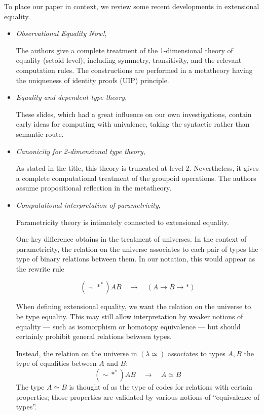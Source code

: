 \documentclass[10pt]{article}
\newcommand{\leeq}{\lambda {\eeq}}
\newcommand{\lRa}{\longrightarrow}
\newcommand{\sta}{*}
\newcommand{\rrule}{\hspace{1em}\lRa\hspace{1em}}
\newcommand{\eeq}{\simeq}
\begin{document}
To place our paper in context, we review some recent developments in
extensional equality.
\begin{itemize}
\item 
\emph{Observational Equality Now!}, \cite{ott}

The authors give a complete treatment of the 1-dimensional theory of equality (setoid level), including symmetry, transitivity, and the relevant computation
rules.  The constructions are performed in a metatheory having
the uniqueness of identity proofs (UIP) principle.
\item 

\emph{Equality and dependent type theory}, \cite{coquand}

These slides, which had a great influence on our own investigations,
contain early ideas for computing with univalence, taking the
syntactic rather than semantic route.
\item 
\emph{Canonicity for 2-dimensional type theory}, \cite{harper}

As stated in the title, this theory is truncated at level 2.
Nevertheless, it gives a complete computational treatment
of the groupoid operations.  The authors assume propositional reflection in the metatheory.
\item 
\emph{Computational interpretation of parametricity},
\cite{intpar}

Parametricity theory is intimately connected to extensional equality.

One key difference obtains in the
treatment of universes.  In the context of parametricity, the relation on the
universe associates to each pair of types the type of binary relations
between them.  In our notation, this would appear as the rewrite rule

\[ ({\sim} \sta^*) A B \rrule (A \to B \to \sta) \]

When defining extensional equality, we want the relation on the
universe to be type equality.  This may still allow interpretation by weaker notions of
equality --- such as isomorphism or homotopy equivalence --- but should
certainly prohibit general relations between types.

Instead, the relation on the universe in $(\leeq)$ associates to types
$A,B$ the type of equalities between $A$ and $B$:
\[ ({\sim} \sta^*) A B \rrule A \eeq B \]
The type $A \eeq B$ is thought of as the type of codes for relations with
certain properties; those properties are validated by various
notions of ``equivalence of types''.


\end{itemize}
\end{document}
